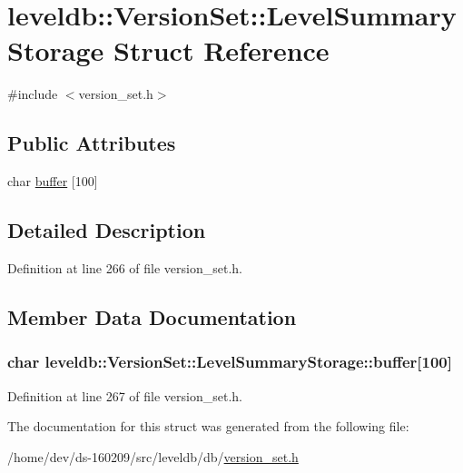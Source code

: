 \hypertarget{structleveldb_1_1_version_set_1_1_level_summary_storage}{}\section{leveldb\+:\+:Version\+Set\+:\+:Level\+Summary\+Storage Struct Reference}
\label{structleveldb_1_1_version_set_1_1_level_summary_storage}


{\ttfamily \#include $<$version\+\_\+set.\+h$>$}

\subsection*{Public Attributes}
\begin{DoxyCompactItemize}
\item 
char \hyperlink{structleveldb_1_1_version_set_1_1_level_summary_storage_a90b283461affa0f25f41bc21a9c81bbc}{buffer} \mbox{[}100\mbox{]}
\end{DoxyCompactItemize}


\subsection{Detailed Description}


Definition at line 266 of file version\+\_\+set.\+h.



\subsection{Member Data Documentation}
\hypertarget{structleveldb_1_1_version_set_1_1_level_summary_storage_a90b283461affa0f25f41bc21a9c81bbc}{}
\subsubsection[{buffer}]{\setlength{\rightskip}{0pt plus 5cm}char leveldb\+::\+Version\+Set\+::\+Level\+Summary\+Storage\+::buffer\mbox{[}100\mbox{]}}\label{structleveldb_1_1_version_set_1_1_level_summary_storage_a90b283461affa0f25f41bc21a9c81bbc}


Definition at line 267 of file version\+\_\+set.\+h.



The documentation for this struct was generated from the following file\+:\begin{DoxyCompactItemize}
\item 
/home/dev/ds-\/160209/src/leveldb/db/\hyperlink{version__set_8h}{version\+\_\+set.\+h}\end{DoxyCompactItemize}
